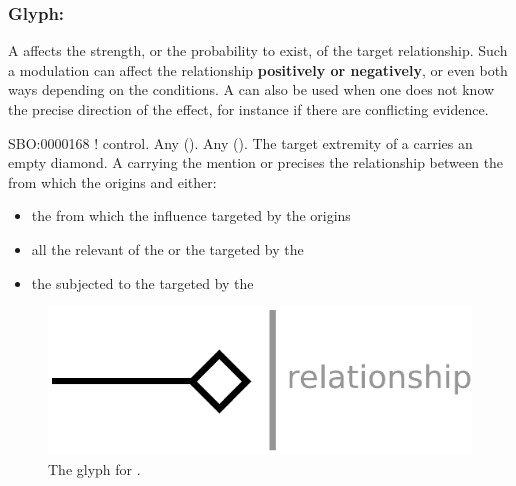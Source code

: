 \color{blue}
\subsubsection{Glyph: }\label{sec:modulation}

A  affects the strength, or the probability to exist, of the target relationship. Such a modulation can affect the relationship \textbf{positively or negatively}, or even both ways depending on the conditions. A  can also be used when one does not know the precise direction of the effect, for instance if there are conflicting evidence.

\begin{glyphDescription}
 \glyphSboTerm SBO:0000168 ! control.
 \glyphOrigin Any  ().
 \glyphTarget Any  ().
 \glyphEndPoint The target extremity of a  carries an empty diamond.
 \glyphAux A  carrying the mention  or  precises the relationship between the  from which the  origins and either:
\begin{itemize}
\item the  from which the influence targeted by the  origins
\item all the relevant  of the  or the  targeted by the 
\item the  subjected to the  targeted by the 
\end{itemize}
 \end{glyphDescription}

\begin{figure}[H]
  \centering
  \includegraphics[scale = 0.5]{images/modulation}
  \caption{The \ER glyph for .}
  \label{fig:modulation}
\end{figure}
 
